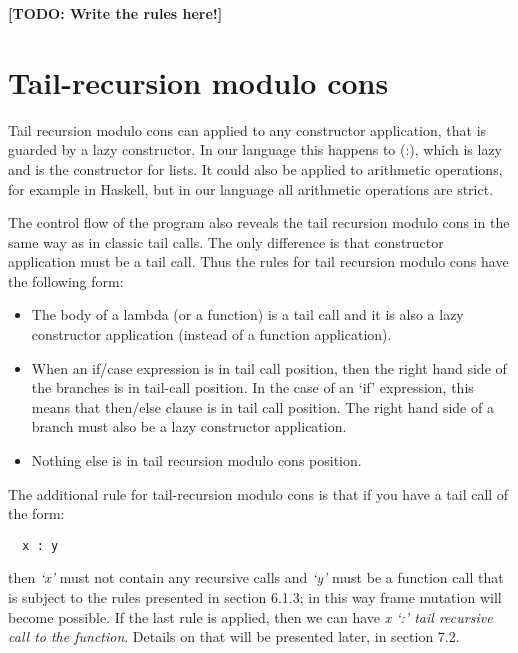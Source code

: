 \documentclass[diploma]{softlab-thesis}
\begin{document}
\textbf{[TODO: Write the rules here!]}

\section{Tail-recursion modulo cons}


Tail recursion modulo cons can applied to any constructor application, that is guarded by a lazy constructor.
In our language this happens to (:), which is lazy and is the constructor for lists. It could also be applied 
to arithmetic operations, for example in Haskell, but in our language all arithmetic operations are strict.

The control flow of the program also reveals the tail recursion modulo cons in the same way as in classic tail 
calls. The only difference is that constructor application must be a tail call. Thus the rules for tail recursion 
modulo cons have the following form:
\begin{itemize} 
  \item The body of a lambda (or a function) is a tail call and it is also a lazy constructor application
  (instead of a function application).
  \item When an if/case expression is in tail call position, then the right hand side of the branches is in tail-call position. 
  In the case of an `if' expression, this means that then/else clause is in tail call position. The right hand side 
  of a branch must also be a lazy constructor application.
  \item Nothing else is in tail recursion modulo cons position.
\end{itemize}


The additional rule for tail-recursion modulo cons is that if you have a tail call of the form:
\begin{verbatim}
  x : y
\end{verbatim}
then \textit{`x'} must not contain any recursive calls and \textit{`y'} must be a function call that is subject to the 
rules presented in section 6.1.3; in this way frame mutation will become possible. If the last rule is applied, 
then we can have \textit{x `:' tail recursive call to the function}. Details on that will be presented later, in section 
7.2.
\end{document}
